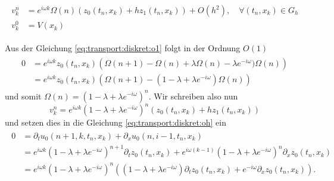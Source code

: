 

\begin{align}\label{exp:ansatz}
\begin{split}
v^n_k &= e^{i \omega k} \Omega(n) \left( z_0(t_n, x_k) + h z_1(t_n, x_k) \right) + O(h^2), \quad \forall (t_n,x_k) \in G_h\\
v^0_k &= V(x_k)
\end{split}
\end{align}

Aus der Gleichung \eqref{eq:transport:diskret:o1} folgt in der Ordnung $O(1)$
\begin{align} 
\begin{split}
0 &= e^{i \omega k} z_0(t_n, x_k) \left( \Omega(n+1) - \Omega(n) + \lambda \Omega(n) - \lambda e^{-i \omega}) \Omega(n) \right)\\
&= e^{i \omega k} z_0(t_n, x_k) \left(\Omega(n+1) - (1 - \lambda + \lambda e^{-i \omega}) \Omega(n) \right)
\end{split}
\end{align}
und somit $\Omega(n) = (1 - \lambda + \lambda e^{-i \omega})^n$. Wir schreiben also nun 
\[ 
v^n_k = e^{i \omega k} (1 - \lambda + \lambda e^{-i \omega})^n \left( z_0(t_n, x_k) + h z_1(t_n, x_k) \right)
\]
und setzen dies in die Gleichung \eqref{eq:transport:diskret:oh} ein
\begin{align}
\begin{split}
0 &= \partial_t u_0(n+1, k, t_n, x_k) + \partial_x u_0(n, i-1, t_n, x_k)\\
&= e^{i \omega k} (1 - \lambda + \lambda e^{-i \omega})^{n+1} \partial_t z_0(t_n, x_k) + e^{i \omega (k-1)} (1 - \lambda + \lambda e^{-i \omega})^n \partial_x z_0(t_n, x_k)\\
&= e^{i \omega k} (1 - \lambda + \lambda e^{-i \omega})^{n} \left( (1 - \lambda + \lambda e^{-i \omega}) \partial_t z_0(t_n, x_k) + e^{- i \omega} \partial_x z_0(t_n, x_k) \right).
\end{split}
\end{align}

